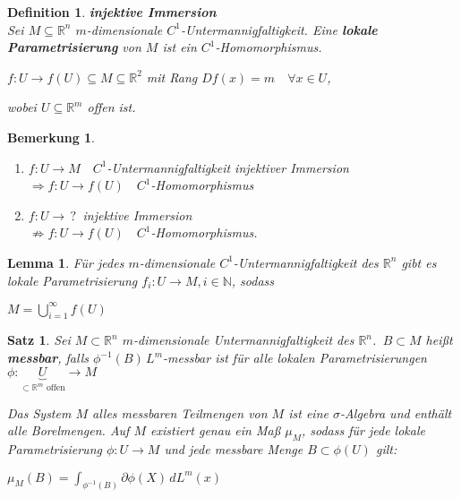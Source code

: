 \documentclass[11pt]{memoir}
\theoremstyle{changebreak}
\newtheorem{Definition}{Definition}[chapter]
\newtheorem{Bemerkung}{Bemerkung}[chapter]
\newtheorem{Lemma}{Lemma}[chapter]
\newtheorem{Satz}{Satz}[chapter]
\newcommand{\umgf}{$m$-dimensionale Untermannigfaltigkeit des $\mathbb R^n$}
\begin{document}
\begin{Definition}
\emph{\textbf{injektive Immersion}} \\
Sei $M \subseteq \mathbb R^n$ $m$-dimensionale $C^1$-Untermannigfaltigkeit. Eine \textbf{lokale Parametrisierung} von $M$ ist ein $C^1$-Homomorphismus.
\par\bigskip
$f: U \rightarrow f(U) \subseteq M \subseteq \mathbb R^2$ mit Rang $Df(x) = m \quad \forall x \in U$,
\par
wobei $U \subseteq \mathbb R^m$ offen ist.
\end{Definition}

\begin{Bemerkung}
\begin{enumerate}
	\item $f: U \rightarrow M \quad C^1$-Untermannigfaltigkeit injektiver Immersion \\
	$\Rightarrow f:U \rightarrow f(U) \quad C^1$-Homomorphismus

	\item $f: U \rightarrow \,?\,$ injektive Immersion \\
	$\nRightarrow f: U \rightarrow f(U) \quad C^1$-Homomorphismus.
\end{enumerate}
\end{Bemerkung}

\begin{Lemma}
Für jedes $m$-dimensionale $C^1$-Untermannigfaltigkeit des $\mathbb R^n$ gibt es lokale Parametrisierung $f_i: U \rightarrow M, i \in \mathbb N$, sodass
\begin{center}
	$M = \bigcup\limits_{i=1}^\infty f(U)$
\end{center}
\end{Lemma}


\begin{Satz}
Sei $M \subset \mathbb R^n$ \umgf. \,$ B \subset M$ heißt \textbf{messbar}, falls $\phi^{-1}(B) \, L^m$-messbar ist für alle lokalen Parametrisierungen \\
 $\phi: \underbrace{U}_{\subset \mathbb R^m \text{ offen}} \rightarrow M$
 \par\bigskip
 Das System $M$ alles messbaren Teilmengen von $M$ ist eine $\sigma$-Algebra und enthält alle Borelmengen. Auf $M$ existiert genau ein Maß $\mu_M$, sodass für jede lokale Parametrisierung $\phi: U \rightarrow M$ und jede messbare Menge $B \subset \phi(U)$ gilt:
 \begin{center}
 	$\mu_M(B) = \int_{\phi^{-1}(B)} \partial \phi(X) \, d L^m(x)$
 \end{center}
\end{Satz}
\end{document}
